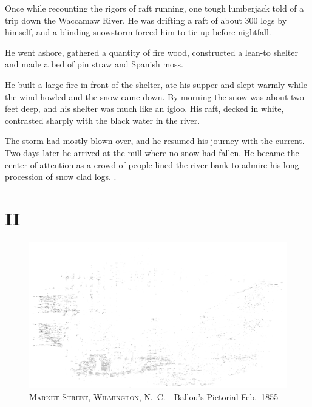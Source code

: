 \documentclass[11pt, a5paper, openright]{book}
\begin{document}
Once while recounting the rigors of raft running, one tough lumberjack
told of a trip down the Waccamaw River.  He was drifting a raft of
about 300 logs by himself, and a blinding snowstorm forced him to tie
up before nightfall.\par

He went ashore, gathered a quantity of fire wood, constructed a
lean-to shelter and made a bed of pin straw and Spanish moss.\par

He built a large fire in front of the shelter, ate his supper and
slept warmly while the wind howled and the snow came down.  By morning
the snow was about two feet deep, and his shelter was much like an
igloo.  His raft, decked in white, contrasted sharply with the black
water in the river.\par

The storm had mostly blown over, and he resumed his journey with the
current.  Two days later he arrived at the mill where no snow had
fallen.  He became the center of attention as a crowd of people lined
the river bank to admire his long procession of snow clad logs.
\citep{stevensjg}.\par

\makeatletter\@openrightfalse%

\part{II}

\begin{figure}[htb]
\centering
  \begin{turn}{90}
      \begin{minipage}{5.8in}
        \centering
        \includegraphics[scale=.18]{ballous_pictorial_24_feb_1855_pp_121}\newline
        \textsc{Market Street, Wilmington, N.~C.}\newline---Ballou's Pictorial Feb.~1855
      \end{minipage}
    \end{turn}
\end{figure}
\end{document}
